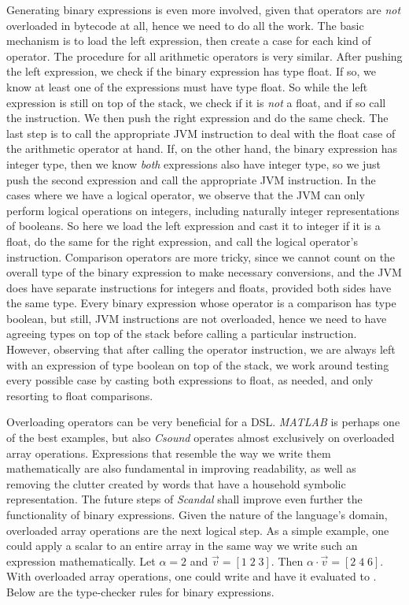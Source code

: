 Generating binary expressions is even more involved, given that operators are \emph{not} overloaded in bytecode at all, hence we need to do all the work. The basic mechanism is to load the left expression, then create a case for each kind of operator. The procedure for all arithmetic operators is very similar. After pushing the left expression, we check if the binary expression has type float. If so, we know at least one of the expressions must have type float. So while the left expression is still on top of the stack, we check if it is \emph{not} a float, and if so call the  instruction. We then push the right expression and do the same check. The last step is to call the appropriate JVM instruction to deal with the float case of the arithmetic operator at hand. If, on the other hand, the binary expression has integer type, then we know \emph{both} expressions also have integer type, so we just push the second expression and call the appropriate JVM instruction. In the cases where we have a logical operator, we observe that the JVM can only perform logical operations on integers, including naturally integer representations of booleans. So here we load the left expression and cast it to integer if it is a float, do the same for the right expression, and call the logical operator's instruction. Comparison operators are more tricky, since we cannot count on the overall type of the binary expression to make necessary conversions, and the JVM does have separate instructions for integers and floats, provided both sides have the same type. Every binary expression whose operator is a comparison has type boolean, but still, JVM instructions are not overloaded, hence we need to have agreeing types on top of the stack before calling a particular instruction. However, observing that after calling the operator instruction, we are always left with an expression of type boolean on top of the stack, we work around testing every possible case by casting both expressions to float, as needed, and only resorting to float comparisons.

Overloading operators can be very beneficial for a DSL. \emph{MATLAB} is perhaps one of the best examples, but also \emph{Csound} operates almost exclusively on overloaded array operations. Expressions that resemble the way we write them mathematically are also fundamental in improving readability, as well as removing the clutter created by words that have a household symbolic representation. The future steps of \emph{Scandal} shall improve even further the functionality of binary expressions. Given the nature of the language's domain, overloaded array operations are the next logical step. As a simple example, one could apply a scalar to an entire array in the same way we write such an expression mathematically. Let $\alpha = 2$ and $\vec{v} = [1 \; 2 \; 3]$. Then $\alpha \cdot \vec{v} = [2 \; 4 \; 6]$. With overloaded array operations, one could write  and have it evaluated to \il{[2, 4, 6]}. Below are the type-checker rules for binary expressions.

